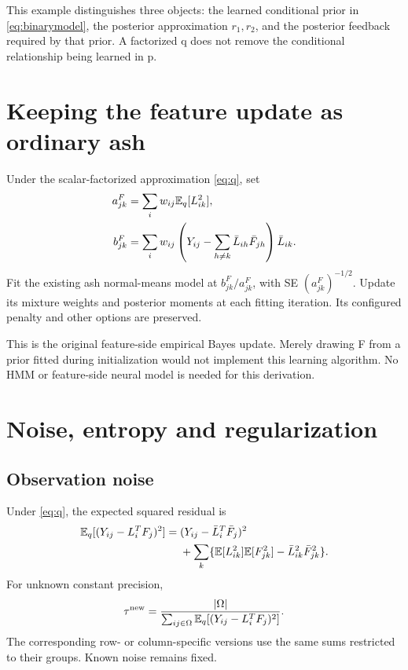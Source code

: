 \documentclass[11pt,a4paper]{article}
\newcommand{\E}{\mathbb E}
\begin{document}
This example distinguishes three objects: the learned conditional prior
in \eqref{eq:binarymodel}, the posterior approximation \(r_1,r_2\), and the
posterior feedback required by that prior. A factorized q does not remove
the conditional relationship being learned in p.

\section{Keeping the feature update as ordinary ash}
Under the scalar-factorized approximation \eqref{eq:q}, set
\begin{align}
a^F_{jk}&=\sum_iw_{ij}\E_q[L_{ik}^2],\notag\\
b^F_{jk}&=\sum_iw_{ij}
\left(Y_{ij}-\sum_{h\ne k}\bar L_{ih}\bar F_{jh}\right)\bar L_{ik}.
\label{eq:Fstats}
\end{align}
Fit the existing ash normal-means model at
\(b^F_{jk}/a^F_{jk}\), with SE \((a^F_{jk})^{-1/2}\). Update its mixture
weights and posterior moments at each fitting iteration. Its configured
penalty and other options are preserved.

This is the original feature-side empirical Bayes update. Merely drawing F
from a prior fitted during initialization would not implement this learning
algorithm. No HMM or feature-side neural model is needed for this derivation.

\clearpage
\section{Noise, entropy and regularization}
\subsection{Observation noise}
Under \eqref{eq:q}, the expected squared residual is
\begin{align}
\E_q[(Y_{ij}-L_i^TF_j)^2]
={}&(Y_{ij}-\bar L_i^T\bar F_j)^2\notag\\
&+\sum_k\{\E[L_{ik}^2]\E[F_{jk}^2]-\bar L_{ik}^2\bar F_{jk}^2\}.
\label{eq:residual}
\end{align}
For unknown constant precision,
\begin{equation}
\tau^{\rm new}=\frac{|\Omega|}
{\sum_{ij\in\Omega}\E_q[(Y_{ij}-L_i^TF_j)^2]}.
\label{eq:noise}
\end{equation}
The corresponding row- or column-specific versions use the same sums
restricted to their groups. Known noise remains fixed.
\end{document}
